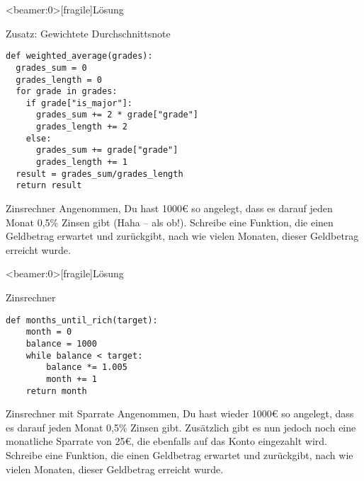 \begin{frame}<beamer:0>[fragile]{Lösung}

\begin{solutionblock}{Zusatz: Gewichtete Durchschnittsnote}
\begin{verbatim}
def weighted_average(grades): 
  grades_sum = 0
  grades_length = 0
  for grade in grades: 
    if grade["is_major"]: 
      grades_sum += 2 * grade["grade"]
      grades_length += 2
    else:
      grades_sum += grade["grade"]
      grades_length += 1
  result = grades_sum/grades_length
  return result 
\end{verbatim}
\end{solutionblock}

\end{frame}


\begin{fragile}[Übung]
\begin{block}{Zinsrechner}
\vspace{2pt}
Angenommen, Du hast 1000€ so angelegt, dass es darauf jeden Monat 0,5\% Zinsen gibt (Haha -- als ob!). 
Schreibe eine Funktion, die einen Geldbetrag erwartet und zurückgibt, nach wie vielen Monaten, dieser Geldbetrag erreicht wurde. 
\end{block}
\end{fragile}

\begin{frame}<beamer:0>[fragile]{Lösung}

\begin{solutionblock}{Zinsrechner}
\begin{verbatim}
def months_until_rich(target):
    month = 0
    balance = 1000
    while balance < target:
        balance *= 1.005
        month += 1
    return month
\end{verbatim}
\end{solutionblock}
\end{frame}



\begin{fragile}[Übung]
\begin{block}{Zinsrechner mit Sparrate}
\vspace{2pt}
Angenommen, Du hast wieder 1000€ so angelegt, dass es darauf jeden Monat 0,5\% Zinsen gibt. Zusätzlich gibt es nun jedoch noch eine monatliche Sparrate von 25€, die ebenfalls auf das Konto eingezahlt wird. 
Schreibe eine Funktion, die einen Geldbetrag erwartet und zurückgibt, nach wie vielen Monaten, dieser Geldbetrag erreicht wurde. 
\end{block}
\end{fragile}

